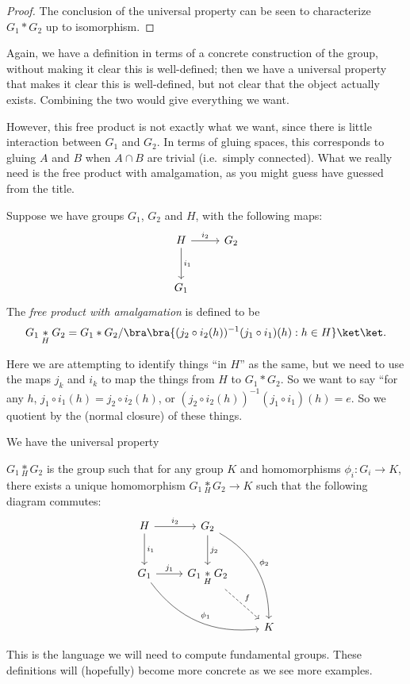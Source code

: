 \documentclass[a4paper]{article}
\begin{document}
\begin{proof}
  The conclusion of the universal property can be seen to characterize $G_1 * G_2$ up to isomorphism.
\end{proof}

Again, we have a definition in terms of a concrete construction of the group, without making it clear this is well-defined; then we have a universal property that makes it clear this is well-defined, but not clear that the object actually exists. Combining the two would give everything we want.

However, this free product is not exactly what we want, since there is little interaction between $G_1$ and $G_2$. In terms of gluing spaces, this corresponds to gluing $A$ and $B$ when $A \cap B$ are trivial (i.e.\ simply connected). What we really need is the free product with amalgamation, as you might guess have guessed from the title.

\begin{defi}
  Suppose we have groups $G_1$, $G_2$ and $H$, with the following maps:
  \[
    \begin{tikzcd}[row sep=large]
      H \ar[r, "i_2"] \ar[d, "i_1"] & G_2\\
      G_1
    \end{tikzcd}
  \]
  The \emph{free product with amalgamation} is defined to be
  \[
    G_1 \underset{H}{*} G_2 = G_1 * G_2/ \bra \bra \{(j_2 \circ i_2(h))^{-1} (j_1 \circ i_1)(h): h\in H\}\ket \ket.
  \]
\end{defi}
Here we are attempting to identify things ``in $H$'' as the same, but we need to use the maps $j_k$ and $i_k$ to map the things from $H$ to $G_1 * G_2$. So we want to say ``for any $h$, $j_1 \circ i_1 (h) = j_2 \circ i_2(h)$, or $(j_2 \circ i_2(h))^{-1} (j_1 \circ i_1)(h) = e$. So we quotient by the (normal closure) of these things.

We have the universal property
\begin{lemma}
  $G_1 \underset{H}{*} G_2$ is the group such that for any group $K$ and homomorphisms $\phi_i: G_i \to K$, there exists a unique homomorphism $G_1 \underset{H}{*} G_2 \to K$ such that the following diagram commutes:
  \[
    \begin{tikzcd}[row sep=large]
      H \ar[r, "i_2"] \ar[d, "i_1"] & G_2 \ar[rdd, bend left, "\phi_2"] \ar[d, "j_2"]\\
      G_1 \ar[rrd, bend right, "\phi_1"] \ar [r, "j_1"] & G_1 \underset{H}{*} G_2 \ar [rd, dashed, "f"]\\
      && K
    \end{tikzcd}
  \]
\end{lemma}
This is the language we will need to compute fundamental groups. These definitions will (hopefully) become more concrete as we see more examples.
\end{document}
